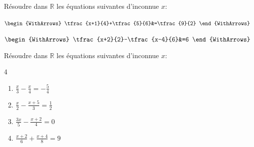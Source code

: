 \documentclass[main.tex]{subfiles}
\begin{document}
\vspace{-1em}  
\begin{example}  Résoudre dans $\mathbb{R}$ les équations suivantes d'inconnue $x$: 
	
	\noindent \parbox{0.45\linewidth}{	
		$\begin{WithArrows}
			\tfrac{x+1}{4}+\tfrac{5}{6}&=\tfrac{9}{2}   
		\end{WithArrows}$ 	
	}\hfill \parbox{0.45\linewidth}{	
		$\begin{WithArrows}
			\tfrac{x+2}{2}-\tfrac{x-4}{6}&=6 
		\end{WithArrows}$ 
	}   
\end{example}
\vfill 
\begin{exercise}\label{chapter07:exercice:equationB} Résoudre dans $\mathbb{R}$ les équations suivantes d'inconnue $x$: \hfill
	  \vspace{-1em}
	\begin{multicols}{4}
		\begin{enumerate}[label={$(E_{\arabic*})$\rule{0pt}{2em}}, leftmargin=*]
			\item $\frac{x}{3}-\frac{x}{4}=-\frac{5}{4}$
			\item $\frac{x}{2}-\frac{x+5}{3}=\frac{1}{2}$
			\item $\frac{3x}{5}-\frac{x+2}{4}=0$ 
			\item  $\frac{x+2}{6}+\frac{x+4}{8}=9$
		\end{enumerate}
	\end{multicols} 	
\end{exercise}
\end{document}
